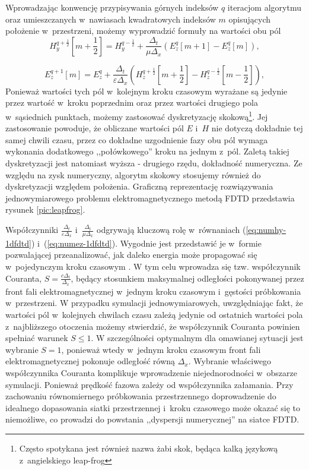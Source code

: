  Wprowadzając konwencję przypisywania górnych indeksów $q$  iteracjom algorytmu oraz umieszczanych w~nawiasach kwadratowych indeksów $m$ opisujących położenie w~przestrzeni, możemy wyprowadzić formuły na wartości obu pól
\begin{equation}
H_y^{q+\frac{1}{2}}[m+\frac{1}{2}]=H_y^{q-\frac{1}{2}}+\frac{\Delta_t}{\mu \Delta_x}(E^q_z[m+1]-E^q_z[m]),
\label{eq:numhy-1dfdtd}
\end{equation}

\begin{equation}
E_z^{q+1}[m]=E_z^{q}+\frac{\Delta_t}{\varepsilon \Delta_x}(H^{q+\frac{1}{2}}_z[m+\frac{1}{2}]-H^{q-\frac{1}{2}}_z[m-\frac{1}{2}]),
\label{eq:numez-1dfdtd}
\end{equation}
 Ponieważ wartości tych pól w~kolejnym kroku czasowym wyrażane są jedynie przez wartość w~kroku poprzednim oraz przez wartości drugiego pola w~sąsiednich punktach, możemy zastosować dyskretyzację skokową\footnote{Często spotykana jest również nazwa żabi skok, będąca kalką językową z~angielskiego leap-frog}. Jej zastosowanie powoduje, że obliczane wartości pól $E$ i~$H$ nie dotyczą dokładnie tej samej chwili czasu, przez co dokładne uzgodnienie fazy obu pól wymaga wykonania dodatkowego ,,połówkowego'' kroku na jednym z~pól. Zaletą takiej dyskretyzacji jest natomiast wyższa - drugiego rzędu, dokładność numeryczna. Ze względu na zysk numeryczny, algorytm skokowy stosujemy również do dyskretyzacji względem położenia. Graficzną reprezentację rozwiązywania jednowymiarowego problemu elektromagnetycznego metodą FDTD przedstawia rysunek \ref{pic:leapfrog}.

Współczynniki $\frac{\Delta_t}{\varepsilon \Delta_x}$ i~$\frac{\Delta_t}{\mu \Delta_x}$ odgrywają kluczową rolę w~równaniach (\ref{eq:numhy-1dfdtd}) i~(\ref{eq:numez-1dfdtd}). Wygodnie jest przedstawić je w~formie pozwalającej przeanalizować, jak daleko energia może propagować się w~pojedynczym kroku czasowym \cite{understanding-fdtd}. W tym celu wprowadza się tzw. współczynnik Couranta, $S=\frac{c \Delta_t}{\Delta_x}$, będący stosunkiem maksymalnej odległości pokonywanej przez front fali elektromagnetycznej w~jednym kroku czasowym i~gęstości próbkowania w~przestrzeni. W przypadku symulacji jednowymiarowych, uwzględniając fakt, że wartości pól w~kolejnych chwilach czasu zależą jedynie od ostatnich wartości pola z~najbliższego otoczenia możemy stwierdzić, że współczynnik Couranta powinien spełniać warunek $S\le1$. W szczególności optymalnym dla omawianej sytuacji jest wybranie $S=1$, ponieważ wtedy w~jednym kroku czasowym front fali elektromagnetycznej pokonuje odległość równą $\Delta_x$. Wybranie właściwego współczynnika Couranta komplikuje wprowadzenie niejednorodności w~obszarze symulacji. Ponieważ prędkość fazowa zależy od współczynnika załamania. Przy zachowaniu równomiernego próbkowania przestrzennego doprowadzenie do idealnego dopasowania siatki przestrzennej i~kroku czasowego może okazać się to niemożliwe, co prowadzi do powstania ,,dyspersji numerycznej'' na siatce FDTD. 

